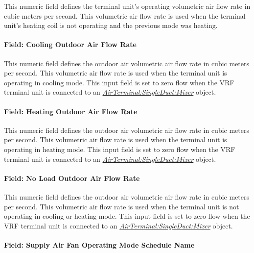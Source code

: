 This numeric field defines the terminal unit's operating volumetric air flow rate in cubic meters per second. This volumetric air flow rate is used when the terminal unit's heating coil is not operating and the previous mode was heating.

\paragraph{Field: Cooling Outdoor Air Flow Rate}\label{field-cooling-outdoor-air-flow-rate-3}

This numeric field defines the outdoor air volumetric air flow rate in cubic meters per second. This volumetric air flow rate is used when the terminal unit is operating in cooling mode. This input field is set to zero flow when the VRF terminal unit is connected to an \textit{\hyperref[airterminalsingleductmixer]{AirTerminal:SingleDuct:Mixer}} object.

\paragraph{Field: Heating Outdoor Air Flow Rate}\label{field-heating-outdoor-air-flow-rate-3}

This numeric field defines the outdoor air volumetric air flow rate in cubic meters per second. This volumetric air flow rate is used when the terminal unit is operating in heating mode. This input field is set to zero flow when the VRF terminal unit is connected to an \textit{\hyperref[airterminalsingleductmixer]{AirTerminal:SingleDuct:Mixer}} object.

\paragraph{Field: No Load Outdoor Air Flow Rate}\label{field-no-load-outdoor-air-flow-rate-2}

This numeric field defines the outdoor air volumetric air flow rate in cubic meters per second. This volumetric air flow rate is used when the terminal unit is not operating in cooling or heating mode. This input field is set to zero flow when the VRF terminal unit is connected to an \textit{\hyperref[airterminalsingleductmixer]{AirTerminal:SingleDuct:Mixer}} object.

\paragraph{Field: Supply Air Fan Operating Mode Schedule Name}\label{field-supply-air-fan-operating-mode-schedule-name-7}


